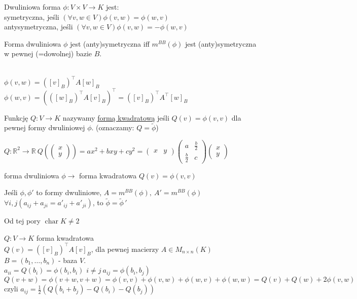 \begin{df} 
    Dwuliniowa forma $\phi: V \times V \to K$ jest: \\ 
        symetryczna, jeśli $(\forall v,w \in V) \phi(v,w) = \phi(w,v)$ \\ 
        antysymetryczna, jeśli $(\forall v,w \in V) \phi(v,w) = - \phi(w,v)$
\end{df} 
\begin{ft} 
    Forma dwuliniowa $\phi$ jest (anty)symetryczna iff $m^{BB} (\phi)$ jest 
    (anty)symetryczna w pewnej (=dowolnej) bazie $B$. 
\end{ft} 
\begin{dd} ~\\ 
    $\phi(v,w) = ([v]_B)^\top A [w]_B$ \\ 
    $\phi(w,v) = (([w]_B)^\top A [v]_B)^\top = ([v]_B)^\top A^\top [w]_B$
\end{dd} 
\begin{df} 
    Funkcję $Q: V \to K$ nazywamy \underline{formą kwadratową} jeśli $Q(v) = \phi(v,v)$ 
    dla pewnej formy dwuliniowej $\phi$. (oznaczamy: $Q = \widetilde \phi$)
\end{df} 
\begin{prz} 
    $Q: \mathbb R^2 \to \mathbb R \ Q(\begin{pmatrix} x \\ y \end{pmatrix}) = ax^2 +bxy+ 
    cy^2 = \begin{pmatrix} x & y \end{pmatrix} \begin{pmatrix} a & \frac{b}{2} \\ 
    \frac{b}{2} & c \end{pmatrix} \begin{pmatrix} x \\ y \end{pmatrix}$
\end{prz} 
forma dwuliniowa $\phi \longrightarrow$ forma kwadratowa $Q(v) = \phi(v,v)$
\begin{uw} Jeśli $\phi,\phi'$ to formy dwuliniowe, $A = m^{BB}(\phi),\ A'=m^{BB}
(\phi)$ \\ 
$\forall i,j (a_{ij} + a_{ji} = a'_{ij} + a'_{ji})$, to $\widetilde\phi = \widetilde
{\phi}\, '$
\end{uw} 
\begin{uw} Od tej pory $\operatorname{char} K \neq 2$ \end{uw}
\begin{uw} $Q: V \to K$ forma kwadratowa \\ 
    $Q(v) = ([v]_B)^\top A [v]_B$, dla pewnej macierzy $A \in M_{n \times n}(K)$
    $B = (b_1,\ldots,b_n)$ - baza $V$. \\ 
    $a_{ii} = Q(b_i) = \phi(b_i,b_i)$
    $i \neq j \ a_{ij} = \phi(b_i,b_j)$ \\ 
    $Q(v+w) = \phi(v+w,v+w) = \phi(v,v)+\phi(v,w)+\phi(w,v)+\phi(w,w) = Q(v)
    + Q(w) + 2\phi(v,w)$
    czyli $a_{ij} = \frac{1}{2} (Q(b_i+b_j) - Q(b_i) - Q(b_j))$
\end{uw} 
